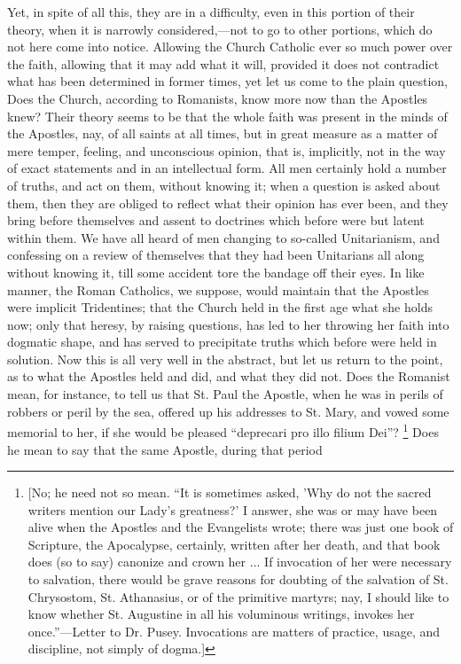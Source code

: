 Yet, in spite of all this, they are in a
difficulty, even in this portion of their theory, when it is narrowly
considered,—not to go to other portions, which do not here come into
notice. Allowing the Church Catholic ever so much power over the
faith, allowing that it may add what it will, provided it does not
contradict what has been determined in former times, yet let us come
to the plain question, Does the Church, according to Romanists, know
more now than the Apostles knew? Their theory seems to be that the
whole faith was present in the minds of the Apostles, nay, of all
saints at all times, but in great measure as a matter of mere temper,
feeling, and unconscious opinion, that is, implicitly, not in the way
of exact statements and in an intellectual form. All men certainly
hold a number of truths, and act on them, without knowing it; when a
question is asked about them, then they are obliged to reflect what
their opinion has ever been, and they bring before themselves and
assent to doctrines which before were but latent within them. We have
all heard of men changing to so-called Unitarianism, and confessing on
a review of themselves that they had been Unitarians all along
without knowing it, till some accident tore the bandage off their
eyes. In like manner, the Roman Catholics, we suppose, would maintain
that the Apostles were implicit Tridentines; that the Church held in
the first age what she holds now; only that heresy, by raising
questions, has led to her throwing her faith into dogmatic shape, and
has served to precipitate truths which before were held in solution.
Now this is all very well in the abstract, but let us return to the
point, as to what the Apostles held and did, and what they did not.
Does the Romanist mean, for instance, to tell us that St. Paul the
Apostle, when he was in perils of robbers or peril by the sea, offered
up his addresses to St. Mary, and vowed some memorial to her, if she
would be pleased ``deprecari pro illo filium Dei''? \footnote{[No; he need not so mean. ``It is sometimes asked, 'Why do not the
sacred writers mention our Lady's greatness?' I answer, she was or may
have been alive when the Apostles and the Evangelists wrote; there was
just one book of Scripture, the Apocalypse, certainly, written after
her death, and that book does (so to say) canonize and crown her ...
If invocation of her were necessary to salvation, there would be grave
reasons for doubting of the salvation of St. Chrysostom, St.
Athanasius, or of the primitive martyrs; nay, I should like to know
whether St. Augustine in all his voluminous writings, invokes her
once.''—Letter to Dr. Pusey. Invocations are matters of practice,
usage, and discipline, not simply of dogma.]} Does he mean to say that the same Apostle, during that period
